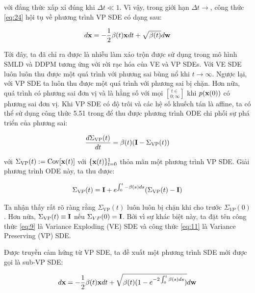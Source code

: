 \documentclass{article} %
\begin{document}
với đẳng thức xấp xỉ đúng khi $\Delta t \ll 1$.
Vì vậy, trong giới hạn $\Delta t \rightarrow$, công thức \ref{eq:24} hội tụ về phương trình VP SDE có dạng sau:

\begin{equation} \label{eq:25}
    d \bold{x} = - \dfrac{1}{2} \beta(t) \bold{x} dt + \sqrt{\beta(t)} d \bold{w}
\end{equation}

Tới đây, ta đã chỉ ra được là nhiễu làm xáo trộn được sử dụng trong mô hình SMLD và DDPM tương ứng với rời rạc hóa của VE và VP SDEs.
Với VE SDE luôn luôn thu được một quá trình với phương sai bùng nổ khi $t \rightarrow \infty$.
Ngược lại, với VP SDE ta luôn thu được một quá trình với phương sai bị chặn.
Hơn nữa, quá trình có phương sai đơn vị và là hằng số với mọi $t \in \brack 0;\infty $ khi $p(\bold{x}(0))$ có phương sai đơn vị.
Khi VP SDE có độ trôi và các hệ số khuếch tán là affine, ta có thể sử dụng công thức 5.51 trong \citep{sarkka2019applied} để thu được phương trình ODE chi phối sự phá triển của phương sai:

\begin{equation*}
    \dfrac{d \Sigma_{\mathrm{VP}}(t)}{dt} = \beta(t) (\bold{I} - \Sigma_{\mathrm{VP}}(t))
\end{equation*}

với $\Sigma_{\mathrm{VP}}(t) := \mathrm{Cov} \lbrack \bold{x}(t) \rbrack$ với $\lbrace \bold{x}(t) \rbrace_{t=0}^1$ thỏa mãn một phương trình VP SDE.
Giải phương trình ODE này, ta thu được:

\begin{equation} \label{eq:26}
    \Sigma_{\mathrm{VP}}(t) = \bold{I} + e^{\int_{0}^t - \beta(s)ds} (\Sigma_{\mathrm{VP}}(t) - \bold{I})
\end{equation}

Ta nhận thấy rất rõ ràng rằng $\Sigma_{\mathrm{VP}}(t)$ luôn luôn bị chặn khi cho trước $\Sigma_{VP}(0)$.
Hơn nữa, $\Sigma_{\mathrm{VP}}(t) \equiv \bold{I}$ nếu $\Sigma_{VP}(0) = \bold{I}$.
Bởi vì sự khác biệt này, ta đặt tên công thức \ref{eq:9} là Variance Exploding (VE) SDE và công thức \ref{eq:11} là Variance Preserving (VP) SDE.

Được truyền cảm hứng từ VP SDE, ta đề xuất một phương trình SDE mới được gọi là sub-VP SDE:

\begin{equation} \label{eq:26}
    d \bold{x} = - \dfrac{1}{2} \beta(t) \bold{x} d t + \sqrt{\beta(t) ( 1 - e^{-2\int_{0}^t \beta(s)ds})} d \bold{w}
\end{equation}
\end{document}
